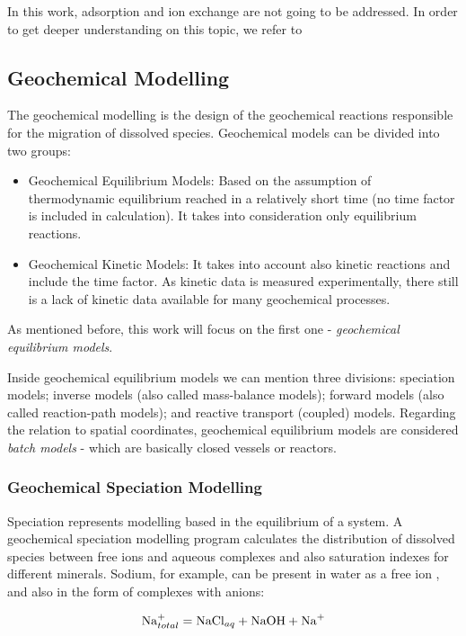 In this work, adsorption and ion exchange are not going to be addressed. In order to get deeper understanding on this topic, we refer to \cite{Freeze:79}

\subsection{Geochemical Modelling}
The geochemical modelling is the design of the geochemical reactions responsible for the migration of dissolved species. Geochemical models can be divided into two groups:
\begin{itemize}
\item Geochemical Equilibrium Models: Based on the assumption of thermodynamic equilibrium reached in a relatively short time (no time factor is included in calculation). It takes into consideration only equilibrium reactions.
\item Geochemical Kinetic Models: It takes into account also kinetic reactions and include the time factor. As kinetic data is measured experimentally, there still is a lack of kinetic data available for many geochemical processes. 
\end{itemize}

As mentioned before, this work will focus on the first one - \emph{geochemical equilibrium models}.

Inside geochemical equilibrium models we can mention three divisions: speciation models; inverse models (also called mass-balance models); forward models (also called reaction-path models); and reactive transport (coupled) models. Regarding the relation to spatial coordinates, geochemical equilibrium models are considered \emph{batch models} - which are basically closed vessels or reactors.

\subsubsection{Geochemical Speciation Modelling}
Speciation represents modelling based in the equilibrium of a system. A geochemical speciation modelling program calculates the distribution of dissolved species between free ions and aqueous complexes and also saturation indexes for different minerals. Sodium, for example, can be present in water as a free ion , and also in the form of complexes with anions:

\begin{equation}
\ce{Na^+}_{total} = \ce{NaCl}_{aq} + \ce{NaOH} + \ce{Na^+}
\end{equation}

